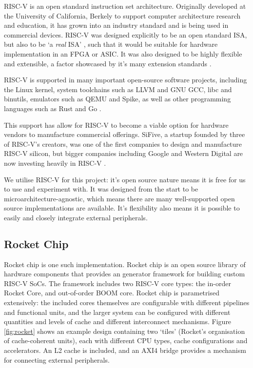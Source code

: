 RISC-V is an open standard instruction set architecture. Originally developed at the University of California, Berkely to support computer architecture research and education, it has grown into an industry standard and is being used in commercial devices. RISC-V was designed explicitly to be an open standard ISA, but also to be `a \textit{real} ISA' \cite{riscv_design}, such that it would be suitable for hardware implementation in an FPGA or ASIC. It was also designed to be highly flexible and extensible, a factor showcased by it's many extension standards \cite{riscv_spec}.

RISC-V is supported in many important open-source software projects, including the Linux kernel, system toolchains such as LLVM and GNU GCC, libc and binutils, emulators such as QEMU and Spike, as well as other programming languages such as Rust and Go \cite{riscv_wiki}.

This support has allow for RISC-V to become a viable option for hardware vendors to manufacture commercial offerings. SiFive, a startup founded by three of RISC-V's creators, was one of the first companies to design and manufacture RISC-V silicon, but bigger companies including Google and Western Digital are now investing heavily in RISC-V \cite{riscv_article}.

We utilise RISC-V for this project: it's open source nature means it is free for us to use and experiment with. It was designed from the start to be microarchitecture-agnostic, which means there are many well-supported open source implementations are available. It's flexibility also means it is possible to easily and closely integrate external peripherals.


\subsection{Rocket Chip}

Rocket chip is one such implementation. Rocket chip is an open source library of hardware components that provides an generator framework for building custom RISC-V SoCs. The framework includes two RISC-V core types: the in-order Rocket Core, and out-of-order BOOM core. Rocket chip is parametrised extensively: the included cores themselves are configurable with different pipelines and functional units, and the larger system can be configured with different quantities and levels of cache and different interconnect mechanisms. Figure \ref{fig:rocket} shows an example design containing two `tiles' (Rocket's organisation of cache-coherent units), each with different CPU types, cache configurations and accelerators. An L2 cache is included, and an AXI4 bridge provides a mechanism for connecting external peripherals.

